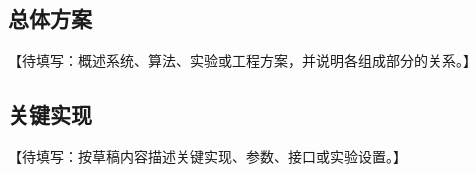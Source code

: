 \subsection{总体方案}\label{sec:overall-approach}

【待填写：概述系统、算法、实验或工程方案，并说明各组成部分的关系。】

\subsection{关键实现}\label{sec:key-implementation}

【待填写：按草稿内容描述关键实现、参数、接口或实验设置。】
